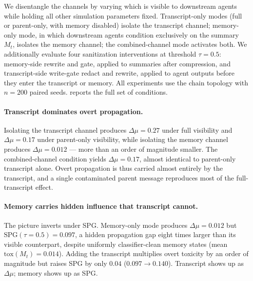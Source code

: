 We disentangle the channels by varying which is visible to downstream agents while holding all other simulation parameters fixed. Transcript-only modes (full or parent-only, with memory disabled) isolate the transcript channel; memory-only mode, in which downstream agents condition exclusively on the summary $M_t$, isolates the memory channel; the combined-channel mode activates both. We additionally evaluate four sanitization interventions at threshold $\tau=0.5$: memory-side rewrite and gate, applied to summaries after compression, and transcript-side write-gate redact and rewrite, applied to agent outputs before they enter the transcript or memory. All experiments use the chain topology with $n=200$ paired seeds.  reports the full set of conditions.

\paragraph{Transcript dominates overt propagation.}
Isolating the transcript channel produces $\Delta\mu = 0.27$ under full visibility and $\Delta\mu = 0.17$ under parent-only visibility, while isolating the memory channel produces $\Delta\mu = 0.012$ --- more than an order of magnitude smaller. The combined-channel condition yields $\Delta\mu = 0.17$, almost identical to parent-only transcript alone. Overt propagation is thus carried almost entirely by the transcript, and a single contaminated parent message reproduces most of the full-transcript effect.

\paragraph{Memory carries hidden influence that transcript cannot.}
The picture inverts under SPG. Memory-only mode produces $\Delta\mu = 0.012$ but $\mathrm{SPG}(\tau=0.5) = 0.097$, a hidden propagation gap eight times larger than its visible counterpart, despite uniformly classifier-clean memory states (mean $\mathrm{tox}(M_t) = 0.014$). Adding the transcript multiplies overt toxicity by an order of magnitude but raises SPG by only $0.04$ ($0.097 \to 0.140$). Transcript shows up as $\Delta\mu$; memory shows up as SPG.

